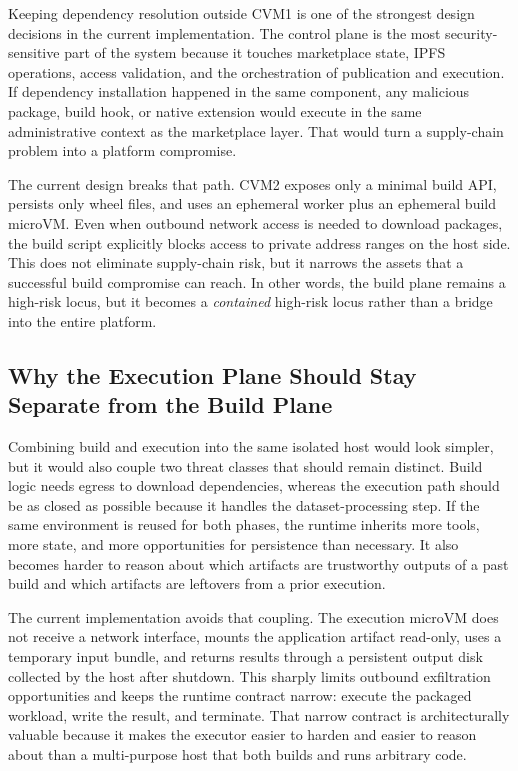 \documentclass[sigconf,nonacm]{acmart}
\begin{document}
Keeping dependency resolution outside CVM1 is one of the strongest design decisions in the current implementation. The control plane is the most security-sensitive part of the system because it touches marketplace state, IPFS operations, access validation, and the orchestration of publication and execution. If dependency installation happened in the same component, any malicious package, build hook, or native extension would execute in the same administrative context as the marketplace layer. That would turn a supply-chain problem into a platform compromise.

The current design breaks that path. CVM2 exposes only a minimal build API, persists only wheel files, and uses an ephemeral worker plus an ephemeral build microVM. Even when outbound network access is needed to download packages, the build script explicitly blocks access to private address ranges on the host side. This does not eliminate supply-chain risk, but it narrows the assets that a successful build compromise can reach. In other words, the build plane remains a high-risk locus, but it becomes a \emph{contained} high-risk locus rather than a bridge into the entire platform.

\subsection{Why the Execution Plane Should Stay Separate from the Build Plane}

Combining build and execution into the same isolated host would look simpler, but it would also couple two threat classes that should remain distinct. Build logic needs egress to download dependencies, whereas the execution path should be as closed as possible because it handles the dataset-processing step. If the same environment is reused for both phases, the runtime inherits more tools, more state, and more opportunities for persistence than necessary. It also becomes harder to reason about which artifacts are trustworthy outputs of a past build and which artifacts are leftovers from a prior execution.

The current implementation avoids that coupling. The execution microVM does not receive a network interface, mounts the application artifact read-only, uses a temporary input bundle, and returns results through a persistent output disk collected by the host after shutdown. This sharply limits outbound exfiltration opportunities and keeps the runtime contract narrow: execute the packaged workload, write the result, and terminate. That narrow contract is architecturally valuable because it makes the executor easier to harden and easier to reason about than a multi-purpose host that both builds and runs arbitrary code.
\end{document}
